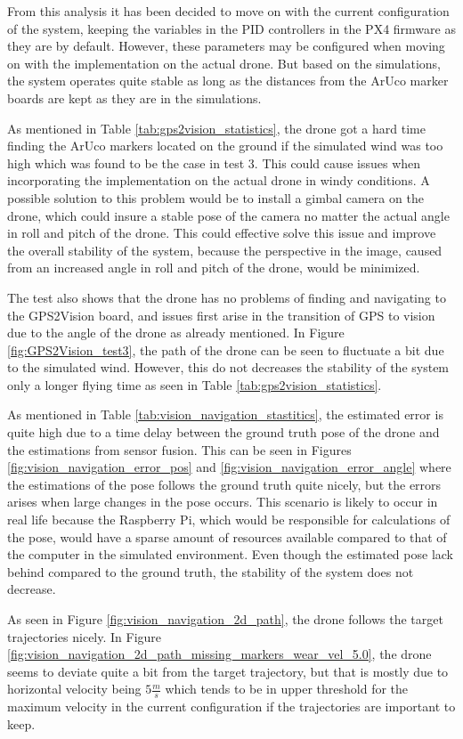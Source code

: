 \documentclass[../Head/report.tex]{subfiles}
\begin{document}
From this analysis it has been decided to move on with the current configuration of the system, keeping the variables in the PID controllers in the PX4 firmware as they are by default. However, these parameters may be configured when moving on with the implementation on the actual drone. But based on the simulations, the system operates quite stable as long as the distances from the ArUco marker boards are kept as they are in the simulations.   

As mentioned in Table \ref{tab:gps2vision_statistics}, the drone got a hard time finding the ArUco markers located on the ground if the simulated wind was too high which was found to be the case in test 3. This could cause issues when incorporating the implementation on the actual drone in windy conditions. A possible solution to this problem would be to install a gimbal camera on the drone, which could insure a stable pose of the camera no matter the actual angle in roll and pitch of the drone. This could effective solve this issue and improve the overall stability of the system, because the perspective in the image, caused from an increased angle in roll and pitch of the drone, would be minimized.

The test also shows that the drone has no problems of finding and navigating to the GPS2Vision board, and issues first arise in the transition of GPS to vision due to the angle of the drone as already mentioned. In Figure \ref{fig:GPS2Vision_test3}, the path of the drone can be seen to fluctuate a bit due to the simulated wind. However, this do not decreases the stability of the system only a longer flying time as seen in Table \ref{tab:gps2vision_statistics}. 

As mentioned in Table \ref{tab:vision_navigation_stastitics}, the estimated error is quite high due to a time delay between the ground truth pose of the drone and the estimations from sensor fusion. This can be seen in Figures \ref{fig:vision_navigation_error_pos} and \ref{fig:vision_navigation_error_angle} where the estimations of the pose follows the ground truth quite nicely, but the errors arises when large changes in the pose occurs. This scenario is likely to occur in real life because the Raspberry Pi, which would be responsible for calculations of the pose, would have a sparse amount of resources available compared to that of the computer in the simulated environment. Even though the estimated pose lack behind compared to the ground truth, the stability of the system does not decrease.   

As seen in Figure \ref{fig:vision_navigation_2d_path}, the drone follows the target trajectories nicely. In Figure \ref{fig:vision_navigation_2d_path_missing_markers_wear_vel_5.0}, the drone seems to deviate quite a bit from the target trajectory, but that is mostly due to horizontal velocity being $5 \frac{m}{s}$ which tends to be in upper threshold for the maximum velocity in the current configuration if the trajectories are important to keep. 
\end{document}
